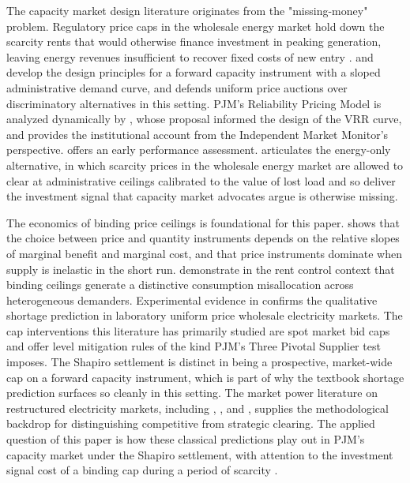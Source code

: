 The capacity market design literature originates from the
"missing-money" problem. Regulatory price caps in the wholesale
energy market hold down the scarcity rents that would otherwise
finance investment in peaking generation, leaving energy revenues
insufficient to recover fixed costs of new entry
\citep{Joskow2007_capacity, Joskow2008_capacity_payments}.
\citet{Cramton2005_capacity} and \citet{CramtonOckenfels2012_capacity}
develop the design principles for a forward capacity instrument with
a sloped administrative demand curve, and
\citet{Cramton2007_uniform} defends uniform price auctions over
discriminatory alternatives in this setting. PJM's Reliability
Pricing Model is analyzed dynamically by \citet{Hobbs2007_rpm}, whose
proposal informed the design of the VRR curve, and
\citet{Bowring2013_pjm} provides the institutional account from the
Independent Market Monitor's perspective.
\citet{Pfeifenberger2011_rpm} offers an early performance assessment.
\citet{Hogan2005_energy_adequacy} articulates the energy-only
alternative, in which scarcity prices in the wholesale energy market
are allowed to clear at administrative ceilings calibrated to the
value of lost load and so deliver the investment signal that
capacity market advocates argue is otherwise missing.

The economics of binding price ceilings is foundational for this paper.
\citet{Weitzman1974_prices} shows that the choice between price and
quantity instruments depends on the relative slopes of marginal
benefit and marginal cost, and that price instruments dominate when
supply is inelastic in the short run. \citet{GlaeserLuttmer2003_rent}
demonstrate in the rent control context that binding ceilings
generate a distinctive consumption misallocation across heterogeneous
demanders. Experimental evidence in \citet{Vossler2009_price_caps}
confirms the qualitative shortage prediction in laboratory
uniform price wholesale electricity markets. The cap interventions
this literature has primarily studied are spot market bid caps and
offer level mitigation rules of the kind PJM's Three Pivotal Supplier
test imposes. The Shapiro settlement is distinct in being a
prospective, market-wide cap on a forward capacity instrument, which
is part of why the textbook shortage prediction surfaces so cleanly
in this setting. The market power literature on restructured electricity markets, including
\citet{Wolak2003_measuring}, \citet{Borenstein2002_market_power}, and
\citet{Bushnell2008_vertical}, supplies the methodological backdrop
for distinguishing competitive from strategic clearing. The
applied question of this paper is how these classical predictions
play out in PJM's capacity market under the Shapiro settlement, with
attention to the investment signal cost of a binding cap during a
period of scarcity \citep{Cramton2005_capacity}.
